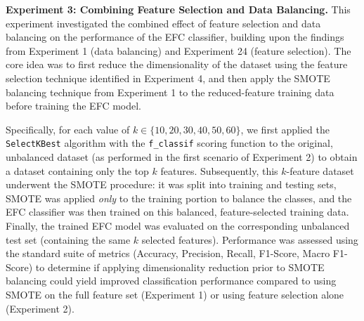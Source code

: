 \documentclass[12pt]{article}
\begin{document}
\textbf{Experiment 3: Combining Feature Selection and Data Balancing.} This experiment investigated the combined effect
of feature selection and data balancing on the performance of the EFC classifier, building upon the findings from
Experiment 1 (data balancing) and Experiment 24 (feature selection). The core idea was to first reduce the dimensionality
of the dataset using the feature selection technique identified in Experiment 4, and then apply the SMOTE balancing
technique from Experiment 1 to the reduced-feature training data before training the EFC model.

Specifically, for each value of $k \in \{10, 20, 30, 40, 50, 60\}$, we first applied the \texttt{SelectKBest} algorithm
with the \texttt{f\_classif} scoring function to the original, unbalanced dataset (as performed in the first scenario of
Experiment 2) to obtain a dataset containing only the top $k$ features. Subsequently, this $k$-feature dataset underwent
the SMOTE procedure: it was split into training and testing sets, SMOTE was applied \textit{only} to the training portion
to balance the classes, and the EFC classifier was then trained on this balanced, feature-selected training data. Finally,
the trained EFC model was evaluated on the corresponding unbalanced test set (containing the same $k$ selected features).
Performance was assessed using the standard suite of metrics (Accuracy, Precision, Recall, F1-Score, Macro F1-Score) to
determine if applying dimensionality reduction prior to SMOTE balancing could yield improved classification performance
compared to using SMOTE on the full feature set (Experiment 1) or using feature selection alone (Experiment 2).
\end{document}
